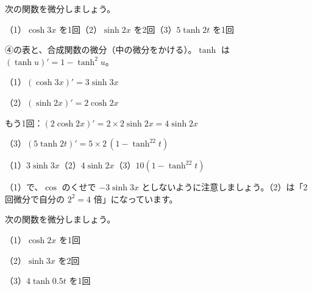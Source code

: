 \begin{reidai}[双曲線関数の微分]
次の関数を微分しましょう。\par
（1）$\cosh3x$ を1回\quad（2）$\sinh2x$ を2回\quad（3）$5\tanh2t$ を1回\par
\kangaekata ④の表と、合成関数の微分（中の微分をかける）。$\tanh$ は $(\tanh u)'=1-\tanh^2u$。\par
\shiki{}\zw{} （1）$(\cosh3x)'=3\sinh3x$\par
\bkvilq （2）$(\sinh2x)'=2\cosh2x$\par
\bkvilb もう1回：$(2\cosh2x)'=2\times2\sinh2x=4\sinh2x$\par
\bkvilq （3）$(5\tanh2t)'=5\times2\,(1-\tanh^22t)$\par
\kotae{}\zw{} （1）$3\sinh3x$\quad（2）$4\sinh2x$\quad（3）$10(1-\tanh^22t)$
\end{reidai}
（1）で、$\cos$ のくせで $-3\sinh3x$ としないように注意しましょう。（2）は「2回微分で自分の $2^2=4$ 倍」になっています。

\begin{jibun}
次の関数を微分しましょう。\par
（1）$\cosh2x$ を1回\par（2）$\sinh3x$ を2回\par（3）$4\tanh0.5t$ を1回
\end{jibun}

